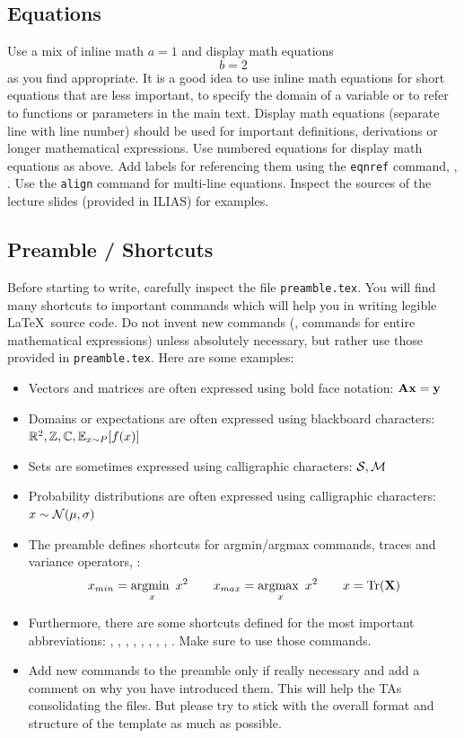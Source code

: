 \documentclass{article}
\begin{document}
\subsection{Equations}

Use a mix of inline math $a=1$ and display math equations
%
\begin{equation}
    b = 2
    \label{eq:b_equals_2}
\end{equation}
%
as you find appropriate. It is a good idea to use inline math equations for short equations that are less important, to specify the domain of a variable or to refer to functions or parameters in the main text. Display math equations (separate line with line number) should be used for important definitions, derivations or longer mathematical expressions. Use numbered equations for display math equations as above. Add labels for referencing them using the \texttt{eqnref} command, \eg, . Use the \texttt{align} command for multi-line equations. Inspect the sources of the lecture slides (provided in ILIAS) for examples.

\subsection{Preamble / Shortcuts}

Before starting to write, carefully inspect the file \texttt{preamble.tex}. You will find many shortcuts to important commands which will help you in writing legible \LaTeX~source code. Do not invent new commands (\eg, commands for entire mathematical expressions) unless absolutely necessary, but rather use those provided in \texttt{preamble.tex}. Here are some examples:

\begin{itemize}
    \item Vectors and matrices are often expressed using bold face notation: $\mathbf{A} \mathbf{x} = \mathbf{y}$
    \item Domains or expectations are often expressed using blackboard characters: $\mathbb{R}^2, \mathbb{Z}, \mathbb{C}, \mathbb{E}_{x\sim P}[f(x)]$
    \item Sets are sometimes expressed using calligraphic characters: $\mathcal{S},\mathcal{M}$
    \item Probability distributions are often expressed using calligraphic characters: $x \sim \mathcal{N}(\mu,\sigma)$
    \item The preamble defines shortcuts for argmin/argmax commands, traces and variance operators, \eg:
    \begin{equation}
        x_{min}=\operatorname*{argmin~}_x x^2 \qquad x_{max}=\operatorname*{argmax~}_x x^2 \qquad x = \operatorname*{Tr}(\mathbf{X})
    \end{equation}
    \item Furthermore, there are some shortcuts defined for the most important abbreviations: \eg, \ie, \cf, \etc, \vs, \wrt, \dof, \etal, \iid. Make sure to use those commands.
    \item Add new commands to the preamble only if really necessary and add a comment on why you have introduced them. This will help the TAs consolidating the files. But please try to stick with the overall format and structure of the template as much as possible.
\end{itemize}
\end{document}

